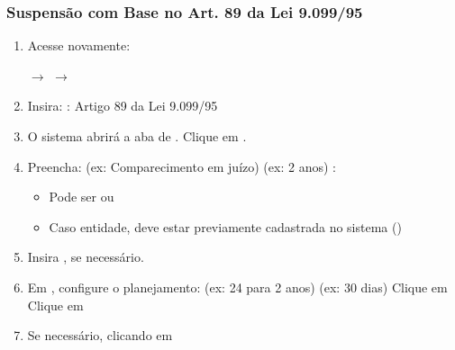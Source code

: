 \documentclass[letterpaper,10pt,brazil]{sphinxmanual}
\begin{document}
\subsubsection{Suspensão com Base no Art. 89 da Lei 9.099/95}
\label{\detokenize{projud_55_cadastrosuspensao:suspensao-com-base-no-art-89-da-lei-9-099-95}}\begin{enumerate}
%
\item {} 
\sphinxAtStartPar
Acesse novamente:

\sphinxAtStartPar
{} \(\rightarrow\)  \(\rightarrow\) 

\item {} 
\sphinxAtStartPar
Insira:
\sphinxhyphen{} 
\sphinxhyphen{} : Artigo 89 da Lei 9.099/95

\item {} 
\sphinxAtStartPar
O sistema abrirá a aba de . Clique em .

\item {} 
\sphinxAtStartPar
Preencha:
\sphinxhyphen{}  (ex: Comparecimento em juízo)
\sphinxhyphen{}  (ex: 2 anos)
\sphinxhyphen{} :
\begin{itemize}
\item {} 
\sphinxAtStartPar
Pode ser  ou 

\item {} 
\sphinxAtStartPar
Caso entidade, deve estar previamente cadastrada no sistema ()

\end{itemize}

\item {} 
\sphinxAtStartPar
Insira , se necessário.

\item {} 
\sphinxAtStartPar
Em , configure o planejamento:
\sphinxhyphen{} 
\sphinxhyphen{}  (ex: 24 para 2 anos)
\sphinxhyphen{}  (ex: 30 dias)
\sphinxhyphen{} Clique em 
\sphinxhyphen{} Clique em 

\item {} 
\sphinxAtStartPar
Se necessário,  clicando em 

\end{enumerate}
\end{document}

